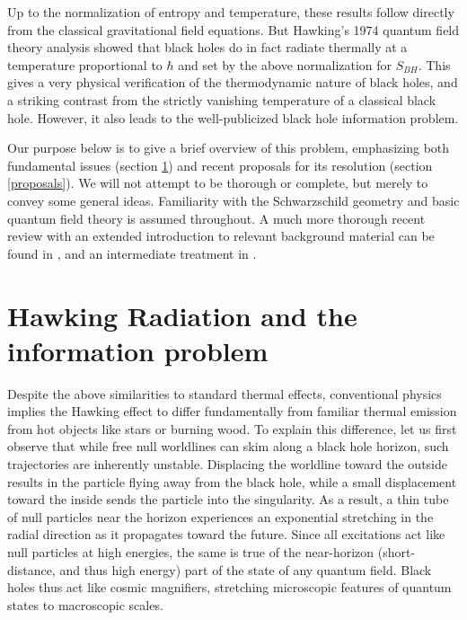 \documentclass[10pt]{article}
\begin{document}
Up to the normalization of entropy and temperature, these results follow directly from the classical gravitational field equations.  But Hawking's 1974 quantum field theory analysis \cite{Hawking:1974sw} showed that black holes do in fact radiate thermally at a temperature proportional to $\hbar$ and set by the above normalization for $S_{BH}$. This gives a very physical verification of the thermodynamic nature of black holes, and a striking contrast from the strictly vanishing temperature of a classical black hole.  However, it also leads to the well-publicized black hole information problem.

Our purpose below is to give a brief overview of this problem, emphasizing both fundamental issues (section \ref{HR}) and recent proposals for its resolution (section \ref{proposals}).  We will not attempt to be thorough or complete, but merely to convey some general ideas.  Familiarity with the Schwarzschild geometry and basic quantum field theory is assumed throughout.   A much more thorough recent review with an extended introduction to relevant background material can be found in \cite{Harlow:2014yka}, and an intermediate treatment in \cite{Polchinski:2016hrw}.


\section{Hawking Radiation and the information problem}
\label{HR}

Despite the above similarities to standard thermal effects, conventional physics implies the Hawking effect to differ fundamentally from familiar thermal emission from hot objects like stars or burning wood.  To explain this difference, let us first observe that while free null worldlines can skim along a black hole horizon, such trajectories are inherently unstable.  Displacing the worldline toward the outside results in the particle flying away from the black hole, while a small displacement toward the inside sends the particle into the singularity.  As a result, a thin tube of null particles near the horizon experiences an exponential stretching in the radial direction as it propagates toward the future. Since all excitations act like null particles at high energies, the same is true of the near-horizon (short-distance, and thus high energy) part of the state of any quantum field.    Black holes thus act like cosmic magnifiers, stretching microscopic features of quantum states to macroscopic scales.
\end{document}

